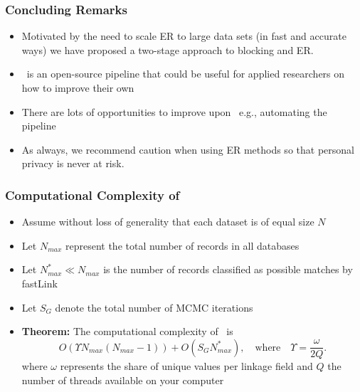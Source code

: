 \documentclass[9pt]{beamer}
\begin{document}

\begin{frame}
\frametitle{Concluding Remarks}

\begin{itemize}
\item Motivated by the need to scale ER to large data sets (in fast and accurate ways) we have proposed a 
two-stage approach to blocking and ER.
\vfill
\item \fLdb\ is an open-source pipeline that could be useful for applied researchers on how to improve their
own
\vfill 
\item There are lots of opportunities to improve upon \fLdb\ e.g., automating the pipeline
\vfill
\item As always, we recommend caution when using ER methods so that personal privacy is never at risk.
\vfill
\end{itemize}

\end{frame}


\begin{frame}
\frametitle{Computational Complexity of \fLdb\ }

\begin{itemize}
\item Assume without loss of generality that each dataset is of equal size $N$ \vfill
\item Let $N_{max}$ represent the total number of records in all databases \vfill
\item Let $N^{\ast}_{max} \ll N_{max}$ is the number of records classified as possible matches by fastLink \vfill
\item Let $S_G$ denote the total number of MCMC iterations \vfill
\item {\bf Theorem:} The computational complexity of \fLdb\ is $$O(\Upsilon N_{max}  (N_{max} - 1)) + O(S_G N^\ast_{max}), \quad \text{where} \quad \Upsilon  = \frac{\omega}{2Q}.$$
where $\omega$ represents the share of unique values per linkage field and $Q$ the number of threads available on your computer
\end{itemize}
 \vfill
\end{frame}
\end{document}
